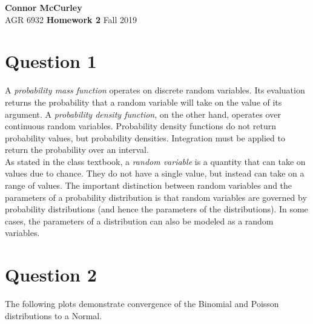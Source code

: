 \documentclass{article}[12 pt]
\begin{document}
	
\begin{center}
	\textbf{\Large Connor McCurley} \\
	AGR 6932  \qquad \quad \quad \textbf{\large Homework 2} \quad \quad \qquad Fall 2019 
\end{center}



\section*{Question 1}
A \textit{probability mass function} operates on discrete random variables.  Its evaluation returns the probability that a random variable will take on the value of its argument.  A \textit{probability  density function}, on the other hand, operates over continuous random variables.  Probability density functions do not return probability values, but probability densities. Integration must be applied to return the probability over an interval. \\

\noindent
As stated in the class textbook, a \textit{random variable} is a quantity that can take on values due to chance.  They do not have a single value, but instead can take on a range of values.  The important distinction between random variables and the parameters of a probability distribution is that random variables are governed by probability distributions (and hence the parameters of the distributions).  In some cases, the parameters of a distribution can also be modeled as a random variables. 


\section*{Question 2}
The following plots demonstrate convergence of the Binomial and Poisson distributions to a Normal.

\begin{figure}[H]%
	\centering
	\qquad
	\qquad
	\qquad
	\qquad
	\qquad
	\caption{}%
	\label{fig:q2_bin_to_normal}%
\end{figure}
\end{document}

